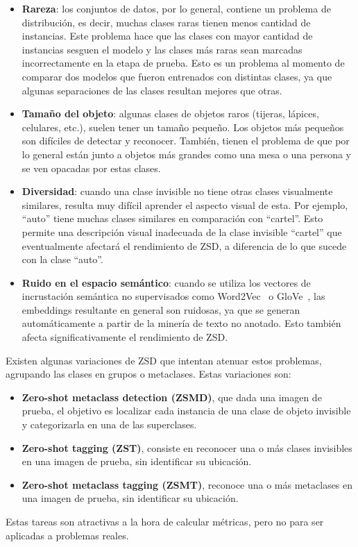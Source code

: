 \begin{itemize}
	\item \textbf{Rareza}: los conjuntos de datos, por lo general, contiene un problema de distribución, es decir, muchas clases raras tienen menos cantidad de instancias. Este problema hace que las clases con mayor cantidad de instancias sesguen el modelo y las clases más raras sean marcadas incorrectamente en la etapa de prueba. Esto es un problema al momento de comparar dos modelos que fueron entrenados con distintas clases, ya que algunas separaciones  de las clases resultan mejores que otras.

	\item \textbf{Tamaño del objeto}: algunas clases de objetos raros (tijeras, lápices, celulares, etc.), suelen tener un tamaño pequeño. Los objetos más pequeños son difíciles de detectar y reconocer. También, tienen el problema de que por lo general están junto a objetos más grandes como una mesa o una persona y se ven opacadas por estas clases.

	\item \textbf{Diversidad}: cuando una clase invisible no tiene otras clases visualmente similares, resulta muy difícil aprender el aspecto visual de esta. Por ejemplo, ``auto'' tiene muchas clases similares en comparación con ``cartel''. Esto permite una descripción visual inadecuada de la clase invisible ``cartel'' que eventualmente afectará el rendimiento de ZSD, a diferencia de lo que sucede con la clase ``auto''.

	\item \textbf{Ruido en el espacio semántico}: cuando se utiliza los vectores de incrustación semántica no supervisados como Word2Vec~\cite{mikolov2013distributed} o GloVe~\cite{pennington2014glove}, las embeddings resultante en general son ruidosas, ya que se generan automáticamente a partir de la minería de texto no anotado. Esto también afecta significativamente el rendimiento de ZSD.
\end{itemize}

Existen algunas variaciones de ZSD que intentan atenuar estos problemas, agrupando las clases en grupos o metaclases. Estas variaciones son: 

\begin{itemize}

	\item \textbf{Zero-shot metaclass detection (ZSMD)}, que dada una imagen de prueba, el objetivo es localizar cada instancia de una clase de objeto invisible y categorizarla en una de las superclases.

	\item \textbf{Zero-shot tagging (ZST)}, consiste en reconocer una o más clases invisibles en una imagen de prueba, sin identificar su ubicación.

	\item \textbf{Zero-shot metaclass tagging (ZSMT)}, reconoce una o más metaclases en una imagen de prueba, sin identificar su ubicación.

\end{itemize}

	Estas tareas son atractivas a la hora de calcular métricas, pero no para ser aplicadas a problemas reales.